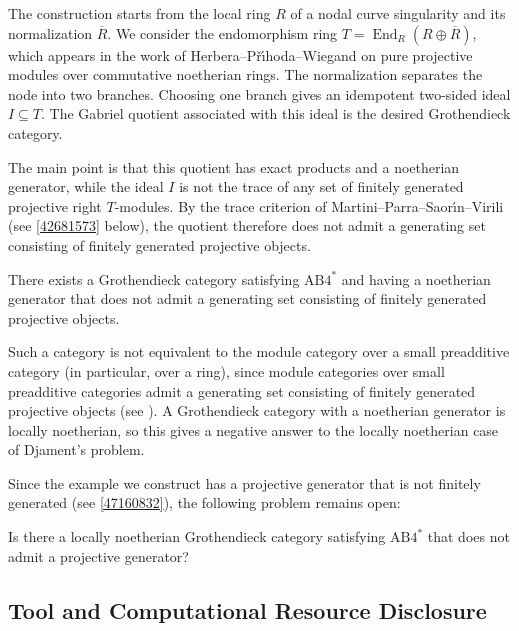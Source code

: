 \documentclass[a4paper,10pt,reqno]{amsart}
\theoremstyle{definition}
\theoremstyle{plain}
\numberwithin{equation}{section}
\DeclareMathOperator{\End}{End}
\newcommand{\ABfourst}{\mathrm{AB4}^{\ast}}
\begin{document}
The construction starts from the local ring $R$ of a nodal curve singularity and its normalization $\overline{R}$. We consider the endomorphism ring $T=\End_{R}(R\oplus \overline{R})$, which appears in the work of Herbera--P\v{r}\'{\i}hoda--Wiegand \cite[Section~8]{MR4915561} on pure projective modules over commutative noetherian rings. The normalization separates the node into two branches. Choosing one branch gives an idempotent two-sided ideal $I\subseteq T$. The Gabriel quotient associated with this ideal is the desired Grothendieck category.

The main point is that this quotient has exact products and a noetherian generator, while the ideal $I$ is not the trace of any set of finitely generated projective right $T$-modules. By the trace criterion of Martini--Parra--Saor\'{\i}n--Virili \cite[Theorem~5.7]{arXiv:2508.00670v2} (see \cref{42681573} below), the quotient therefore does not admit a generating set consisting of finitely generated projective objects.

\begin{theorem}\label{81736405}
There exists a Grothendieck category satisfying $\ABfourst$ and having a noetherian generator that does not admit a generating set consisting of finitely generated projective objects.
\end{theorem}

Such a category is not equivalent to the module category over a small preadditive category (in particular, over a ring), since module categories over small preadditive categories admit a generating set consisting of finitely generated projective objects (see \cite[Section~2.2]{arXiv:2508.00670v2}). A Grothendieck category with a noetherian generator is locally noetherian, so this gives a negative answer to the locally noetherian case of Djament's problem.

Since the example we construct has a projective generator that is not finitely generated (see \cref{47160832}), the following problem remains open:

\begin{problem}
\label{93282996}
Is there a locally noetherian Grothendieck category satisfying $\ABfourst$ that does not admit a projective generator?
\end{problem}

\subsection*{Tool and Computational Resource Disclosure}
\end{document}
